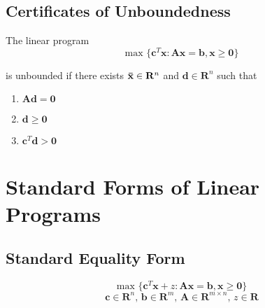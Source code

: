 \subsection{Certificates of Unboundedness}
\begin{theorem}

The linear program
\begin{equation*}
    \text{max } \{\mathbf{c}^T\mathbf{x} : \mathbf{Ax} = \mathbf{b}, \mathbf{x} \geq \mathbf{0} \}
\end{equation*}

is unbounded if there exists $\mathbf{\Bar{x}}\in \mathbf{R}^{n}$ and $\mathbf{d}\in \mathbf{R}^{n}$ such that
    \begin{enumerate}
        \item  \begin{center} $\mathbf{A} \mathbf{d} = \mathbf{0}$ \end{center}
        \item  \begin{center} $\mathbf{d} \geq \mathbf{0}$ \end{center}
        \item  \begin{center} $\mathbf{c}^T \mathbf{d} > \mathbf{0}$ \end{center}
    \end{enumerate}
    
\end{theorem}



\section{Standard Forms of Linear Programs}


\subsection{Standard Equality Form}
\begin{equation*}
    \text{max } \{\mathbf{c}^T\mathbf{x} + z : \mathbf{Ax} = \mathbf{b}, \mathbf{x} \geq \mathbf{0} \}
\end{equation*}
\begin{equation*}
    \mathbf{c} \in \mathbf{R}^n,\, \mathbf{b} \in \mathbf{R}^m,\, \mathbf{A} \in \mathbf{R}^{m\times n},\, z \in \mathbf{R}
\end{equation*}

